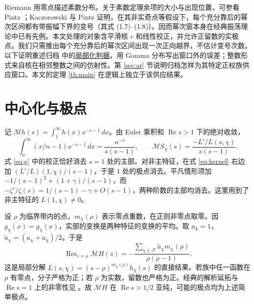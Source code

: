 \documentclass[UTF8,fontset=none,a4paper,11pt]{ctexart}
\theoremstyle{definition}
\newcommand{\re}{\operatorname{Re}}\newcommand{\e}{\varepsilon}
\newcommand{\F}{\mathcal F}\newcommand{\Res}{\operatorname{Res}}
\newcommand{\src}[3]{\href{https://github.com/leanprover-community/riemann-hypothesis/blob/23aebbb302010b292314d406aa97f7901d698634/src/#1.lean\#L#2}{#3}}
\begin{document}
Riemann \cite{riemann} 用零点描述素数分布。关于素数定理余项的大小与出现位置，可参看 Pintz \cite{pintz}；Kaczorowski 与 Pintz \cite{kp} 证明，在其非实奇点等假设下，每个充分靠后的幂次区间都有带振幅下界的变号（其式 (1.7)–(1.8)）。因而幂次窗本身在经典振荡理论中已有先例。本文处理的对象含平滑核 $r$ 和线性校正，并允许正留数的实极点。我们只需推出每个充分靠后的幂次区间出现一次正向越界，不估计变号次数。以下证明重述归档 \cite{archive} 中的\src{Development/AutomorphicArithmetic/DedekindLFunctions/LandauTheorems/ZeroFreeOfRpowWindow}{11}{局部化判据}，用 Gamma 分布写出窗口外的误差；整数形式来自核在相邻整数之间的仿射性。第 \ref{sec:ar} 节说明归档怎样为其特定正权族供应窗口。本文的定理 \ref{th:main} 在逻辑上独立于该供应结果。

\section{中心化与极点}\label{sec:mellin}
记 $\mathcal M h(s)=\int_1^\infty h(x)x^{-s-1}\,dx$。由 Euler 乘积和 $\re s>1$ 下的绝对收敛，
\begin{equation}
 \int_n^\infty(x/n-1)x^{-s-1}\,dx=\frac{n^{-s}}{s(s-1)},\qquad
 \mathcal M S_\chi(s)=\frac{-L'/L(s,\chi)}{s(s-1)}. \label{eq:kernel}
\end{equation}
式 \eqref{eq:g} 中的校正恰好消去 $s=1$ 处的主部。对非主特征，在式 \eqref{eq:kernel} 右边加 $(L'/L)(1,\chi)/(s-1)$，于是 $1$ 处的极点消去。平凡情形须加 $-1/(s-1)^2+(1+\gamma)/(s-1)$，而 $-\zeta'/\zeta(s)=1/(s-1)-\gamma+O(s-1)$，两种阶数的主部均消去。这里用到了非主特征的 $L(1,\chi)\ne0$。

设 $\rho$ 为临界带内的点，$m_\chi(\rho)$ 表示零点重数，在正则非零点取零。因 $\overline{g_\chi(x)}=g_{\bar\chi}(x)$，实部的变换是两种特征的变换的平均。取 $a_{\mathbf1}=1$，$\tilde a_\chi=(a_\chi+a_{\bar\chi})/2$。于是
\begin{equation}
 \Res_{s=\rho}\mathcal M H(s)
 =-\frac{\sum_{\chi\in\F}\tilde a_\chi m_\chi(\rho)}
          {\rho(\rho-1)}. \label{eq:res}
\end{equation}
这是局部分解 $L(s,\chi)=(s-\rho)^{m_\chi(\rho)}h_\chi(s)$ 的直接结果。若族中任一函数在 $\rho$ 有零点，分子严格为正；若 $\rho$ 为实数，留数也严格为正。经典的解析延拓与 $\re s=1$ 上的非零性见 \cite{dav}。故 $\mathcal M H$ 在 $\re s>1/2$ 亚纯，可能的极点均为上述简单极点。
\end{document}
